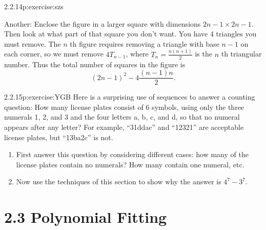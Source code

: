 \documentclass[twoside,11pt,]{book}
\numberwithin{equation}{chapter}
\begin{document}
\begin{divisionsolution}{2.2.14}{}{p:exercise:szs}
\begin{enumerate}[label=(\alph*)]
\par
Another: Enclose the figure in a larger square with dimensions \(2n-1 \times 2n-1\). Then look at what part of that square you don't want. You have 4 triangles you must remove. The \(n\) th figure requires removing a triangle with base \(n-1\) on each corner, so we must remove \(4T_{n-1}\), where \(T_n = \frac{n(n+1)}{2}\) is the \(n\) th triangular number. Thus the total number of squares in the figure is%
\begin{equation*}
(2n-1)^2 - 4\frac{(n-1)n}{2}\text{.}
\end{equation*}
%
\end{enumerate}
%
\end{divisionsolution}%
\begin{divisionsolution}{2.2.15}{}{p:exercise:YGB}%
Here is a surprising use of sequences to answer a counting question:  How many license plates consist of 6 symbols, using only the three numerals 1, 2, and 3 and the four letters a, b, c, and d, so that no numeral appears after any letter?  For example, ``31ddac'' and ``12321'' are acceptable license plates, but ``13ba2c'' is not.%
\begin{enumerate}[label=(\alph*)]
\item{}First answer this question by considering different cases: how many of the license plates contain no numerals?  How many contain one numeral, etc.%
\item{}Now use the techniques of this section to show why the answer is \(4^7 - 3^7\).%
\end{enumerate}
%
\end{divisionsolution}%
\section*{2.3 Polynomial Fitting}
\end{document}
